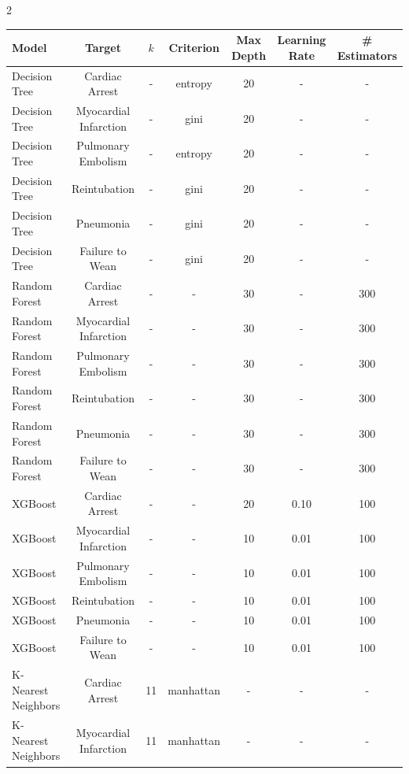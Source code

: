 \documentclass[bst/sn-nature]{sn-jnl}
\begin{document}
\begin{multicols}{2}
\begin{table}
    \centering
    \begin{tabular}{|l|c|c|c|c|c|c|}
    \hline
    \textbf{Model} & \textbf{Target} & \textbf{$k$} & \textbf{Criterion} & \textbf{Max Depth} & \textbf{Learning Rate} & \textbf{\# Estimators} \\
    \hline
    \rowcolor[gray]{0.9} Decision Tree & Cardiac Arrest & - & entropy & 20 & - & - \\
    Decision Tree & Myocardial Infarction & - & gini & 20 & - & - \\
    \rowcolor[gray]{0.9} Decision Tree & Pulmonary Embolism & - & entropy & 20 & - & - \\
    Decision Tree & Reintubation & - & gini & 20 & - & - \\
    \rowcolor[gray]{0.9} Decision Tree & Pneumonia & - & gini & 20 & - & - \\
    Decision Tree & Failure to Wean & - & gini & 20 & - & - \\
    \rowcolor[gray]{0.9} Random Forest & Cardiac Arrest & - & - & 30 & - & 300 \\
    Random Forest & Myocardial Infarction & - & - & 30 & - & 300 \\
    \rowcolor[gray]{0.9} Random Forest & Pulmonary Embolism & - & - & 30 & - & 300 \\
    Random Forest & Reintubation & - & - & 30 & - & 300 \\
    \rowcolor[gray]{0.9} Random Forest & Pneumonia & - & - & 30 & - & 300 \\
    Random Forest & Failure to Wean & - & - & 30 & - & 300 \\
    \rowcolor[gray]{0.9} XGBoost & Cardiac Arrest & - & - & 20 & 0.10 & 100 \\
    XGBoost & Myocardial Infarction & - & - & 10 & 0.01 & 100 \\
    \rowcolor[gray]{0.9} XGBoost & Pulmonary Embolism & - & - & 10 & 0.01 & 100 \\
    XGBoost & Reintubation & - & - & 10 & 0.01 & 100 \\
    \rowcolor[gray]{0.9} XGBoost & Pneumonia & - & - & 10 & 0.01 & 100 \\
    XGBoost & Failure to Wean & - & - & 10 & 0.01 & 100 \\
    \rowcolor[gray]{0.9} K-Nearest Neighbors & Cardiac Arrest & 11 & manhattan & - & - & - \\
    K-Nearest Neighbors & Myocardial Infarction & 11 & manhattan & - & - & - \\

\end{tabular}
\end{table}
\end{multicols}
\end{document}
